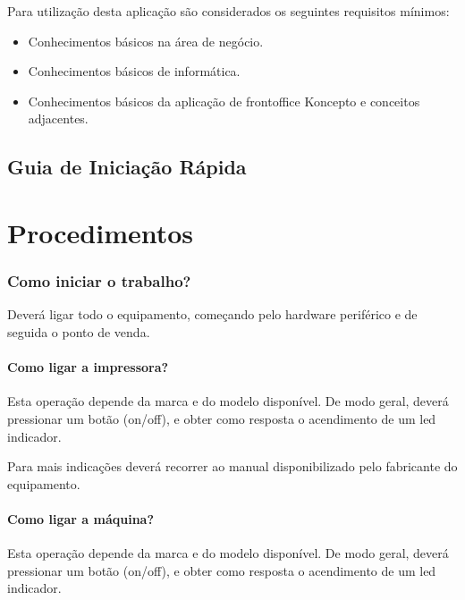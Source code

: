 \documentclass[a4paper,11pt,openany]{memoir}
\begin{document}
Para utilização desta aplicação são considerados os seguintes requisitos mínimos:
\begin{itemize}
\item Conhecimentos básicos na área de negócio.
\item Conhecimentos básicos de informática.
\item Conhecimentos básicos da aplicação de frontoffice Koncepto e conceitos adjacentes.
\end{itemize}




\chapter{Guia de Iniciação Rápida}  %


% 

\newpage



\newpage



\part{Procedimentos}


\section{Como iniciar o trabalho?}
Deverá ligar todo o equipamento, começando pelo hardware periférico e de seguida
o ponto de venda.
\subsection{Como ligar a impressora?}
Esta operação depende da marca e do modelo disponível. De modo geral, deverá
pressionar um botão (on/off), e obter como resposta o acendimento de um led
indicador.


Para mais indicações deverá recorrer ao manual disponibilizado pelo fabricante do
equipamento.

\subsection{Como ligar a máquina?}
Esta operação depende da marca e do modelo disponível. De modo geral, deverá
pressionar um botão (on/off), e obter como resposta o acendimento de um led
indicador.
\end{document}
